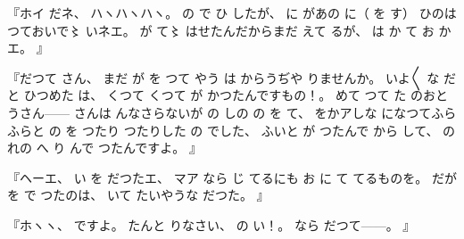 『ホイ
だネ、
%
ハヽハヽハヽ。
%
の
で
ひ
したが、
%
に
があの
に（
を
す）
ひのは
つておいで〻%
いネエ。
%
が
て〻%
はせたんだからまだ
えて%
るが、
%
は
か
て
お
かエ。
』

『だつて
さん、
%
まだ
が
を
つて
やう
は
からうぢや
りませんか。
%
いよ〳〵
な
だと
ひつめた
は、
%
くつて
くつて
が
かつたんですもの！。
%
めて
つて
た
のおとうさん{---}{---}
さんは
んなさらないが
の
しの
の
を
て、
%
をかアしな
になつてふらふらと
の
を
つたり
つたりした
の
でした、
%
ふいと
が
つたんで
から
して、
%
の
れの
へ
り
んで
つたんですよ。
』

『ヘーエ、
%
い
を
だつたエ、
%
マア
なら
じ
てるにも
お
に
て
てるものを。
%
だが
を
で
つたのは、
%
いて
たいやうな
だつた。
』

『ホヽヽ、
%
ですよ。
%
たんと
りなさい、
%
の
い！。
%
なら
だつて{---}{---}。
』

